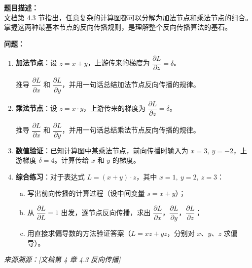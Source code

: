 \documentclass[a4paper,11pt]{ctexart}
\begin{document}
\begin{problembox}
    \textbf{题目描述：}\\
    文档第 4.3 节指出，任意复杂的计算图都可以分解为加法节点和乘法节点的组合。掌握这两种最基本节点的反向传播规则，是理解整个反向传播算法的基石。

    \vspace{0.3cm}
    \textbf{问题：}
    \begin{enumerate}[(1)]
        \item \textbf{加法节点}：设 $z = x + y$，上游传来的梯度为 $\dfrac{\partial L}{\partial z} = \delta$。

        推导 $\dfrac{\partial L}{\partial x}$ 和 $\dfrac{\partial L}{\partial y}$，并用一句话总结加法节点反向传播的规律。

        \item \textbf{乘法节点}：设 $z = x \cdot y$，上游传来的梯度为 $\dfrac{\partial L}{\partial z} = \delta$。

        推导 $\dfrac{\partial L}{\partial x}$ 和 $\dfrac{\partial L}{\partial y}$，并用一句话总结乘法节点反向传播的规律。

        \item \textbf{数值验证}：已知计算图中某乘法节点，前向传播时输入为 $x=3,\ y=-2$，上游梯度 $\delta = 4$。计算传给 $x$ 和 $y$ 的梯度。

        \item \textbf{综合练习}：对于表达式 $L = (x + y) \cdot z$，其中 $x=1,\ y=2,\ z=3$：
        \begin{enumerate}[a.]
            \item 写出前向传播的计算过程（设中间变量 $s = x + y$）；
            \item 从 $\dfrac{\partial L}{\partial L}=1$ 出发，逐节点反向传播，求出 $\dfrac{\partial L}{\partial x}$，$\dfrac{\partial L}{\partial y}$，$\dfrac{\partial L}{\partial z}$；
            \item 用直接求偏导数的方法验证答案（$L = xz + yz$，分别对 $x$、$y$、$z$ 求偏导）。
        \end{enumerate}
    \end{enumerate}

    \vspace{0.2cm}
    {\color{gray}\small\textit{来源溯源：[文档第 4 章 4.3 反向传播]}}
\end{problembox}
\end{document}
